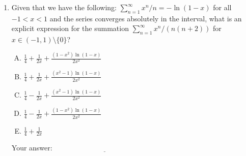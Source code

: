 \documentclass[10pt]{amsart}
\begin{document}
\begin{enumerate}
\item Given that we have the following: $\sum_{n=1}^\infty x^n/n =
  -\ln(1 - x)$ for all $-1 < x < 1$ and the series converges
  absolutely in the interval, what is an explicit expression for the
  summation $\sum_{n=1}^\infty x^n/(n(n+2))$ for $x \in (-1,1)
  \setminus \{ 0 \}$?

  \begin{enumerate}[(A)]
  \item $\frac{1}{4} + \frac{1}{2x} + \frac{(1 - x^2)\ln(1 - x)}{2x^2}$
  \item $\frac{1}{4} + \frac{1}{2x} + \frac{(x^2 - 1)\ln(1 - x)}{2x^2}$
  \item $\frac{1}{4} - \frac{1}{2x} + \frac{(x^2 - 1)\ln(1 - x)}{2x^2}$
  \item $\frac{1}{4} - \frac{1}{2x} + \frac{(1 - x^2)\ln(1 - x)}{2x^2}$
  \item $\frac{1}{4} + \frac{1}{2x}$
  \end{enumerate}

  \vspace{0.1in}
  Your answer: $\underline{\qquad\qquad\qquad\qquad\qquad\qquad\qquad}$
  \vspace{0.15in}

\end{enumerate}
\end{document}

